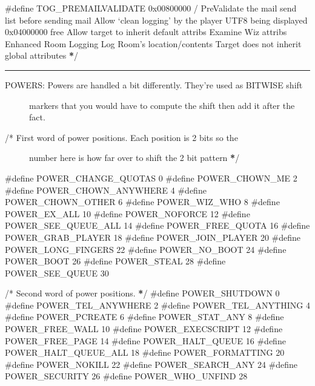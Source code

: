 \documentclass[letterpaper,10pt,english]{sphinxmanual}
\begin{document}
{\#define TOG\_PREMAILVALIDATE     0x00800000      /} Pre\sphinxhyphen{}Validate the mail send list before sending mail  Allow ‘clean logging’ by the player  UTF8 being displayed \sphinxstyleemphasis{/
/} 0x04000000 free  Allow target to inherit default attribs  Examine Wiz attribs  Enhanced Room Logging  Log Room’s location/contents  Target does not inherit global attributes {\color{red}\bfseries{}*}/


\bigskip\hrule\bigskip

\begin{description}
\item[{POWERS:  Powers are handled a bit differently.  They’re used as BITWISE shift}] \leavevmode
\sphinxAtStartPar
markers that you would have to compute the shift then add it after
the fact.

\item[{/* First word of power positions.  Each position is 2 bits so the}] \leavevmode
\sphinxAtStartPar
number here is how far over to shift the 2 bit pattern         {\color{red}\bfseries{}*}/

\end{description}

\sphinxAtStartPar
\#define POWER\_CHANGE\_QUOTAS     0
\#define POWER\_CHOWN\_ME          2
\#define POWER\_CHOWN\_ANYWHERE    4
\#define POWER\_CHOWN\_OTHER       6
\#define POWER\_WIZ\_WHO           8
\#define POWER\_EX\_ALL            10
\#define POWER\_NOFORCE           12
\#define POWER\_SEE\_QUEUE\_ALL     14
\#define POWER\_FREE\_QUOTA        16
\#define POWER\_GRAB\_PLAYER       18
\#define POWER\_JOIN\_PLAYER       20
\#define POWER\_LONG\_FINGERS      22
\#define POWER\_NO\_BOOT           24
\#define POWER\_BOOT              26
\#define POWER\_STEAL             28
\#define POWER\_SEE\_QUEUE         30

\sphinxAtStartPar
/* Second word of power positions. {\color{red}\bfseries{}*}/
\#define POWER\_SHUTDOWN          0
\#define POWER\_TEL\_ANYWHERE      2
\#define POWER\_TEL\_ANYTHING      4
\#define POWER\_PCREATE           6
\#define POWER\_STAT\_ANY          8
\#define POWER\_FREE\_WALL         10
\#define POWER\_EXECSCRIPT        12
\#define POWER\_FREE\_PAGE         14
\#define POWER\_HALT\_QUEUE        16
\#define POWER\_HALT\_QUEUE\_ALL    18
\#define POWER\_FORMATTING        20
\#define POWER\_NOKILL            22
\#define POWER\_SEARCH\_ANY        24
\#define POWER\_SECURITY          26
\#define POWER\_WHO\_UNFIND        28
\end{document}
